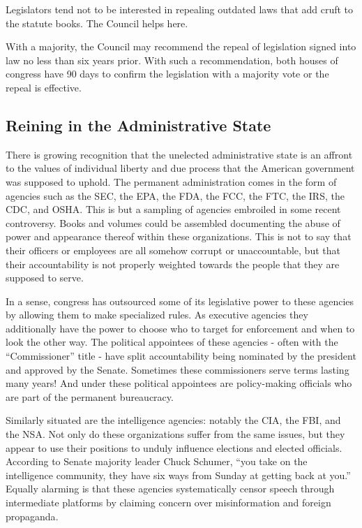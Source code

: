 \documentclass{article}
\newcommand{\quotes}[1]{``#1''}
\begin{document}
Legislators tend not to be interested in repealing outdated laws that add cruft to the statute books. The Council helps here. 

\begin{quoting}
With a majority, the Council may recommend the repeal of legislation signed into law no less than six years prior. With such a recommendation, both houses of congress have 90 days to confirm the legislation with a majority vote or the repeal is effective.
\end{quoting}

\subsection{Reining in the Administrative State}

There is growing recognition that the unelected administrative state is an affront to the values of individual liberty and due process that the American government was supposed to uphold. The permanent administration comes in the form of agencies such as the SEC, the EPA, the FDA, the FCC, the FTC, the IRS, the CDC, and OSHA. This is but a sampling of agencies embroiled in some recent controversy. Books and volumes could be assembled documenting the abuse of power and appearance thereof within these organizations. This is not to say that their officers or employees are all somehow corrupt or unaccountable, but that their accountability is not properly weighted towards the people that they are supposed to serve.

In a sense, congress has outsourced some of its legislative power to these agencies by allowing them to make specialized rules. As executive agencies they additionally have the power to choose who to target for enforcement and when to look the other way. The political appointees of these agencies - often with the \quotes{Commissioner} title - have split accountability being nominated by the president and approved by the Senate. Sometimes these commissioners serve terms lasting many years! And under these political appointees are policy-making officials who are part of the permanent bureaucracy.

Similarly situated are the intelligence agencies: notably the CIA, the FBI, and the NSA. Not only do these organizations suffer from the same issues, but they appear to use their positions to unduly influence elections and elected officials. According to Senate majority leader Chuck Schumer\cite{Stanley}, \quotes{you take on the intelligence community, they have six ways from Sunday at getting back at you.} Equally alarming is that these agencies systematically censor speech through intermediate platforms by claiming concern over misinformation and foreign propaganda\cite{Beanz}.
\end{document}
